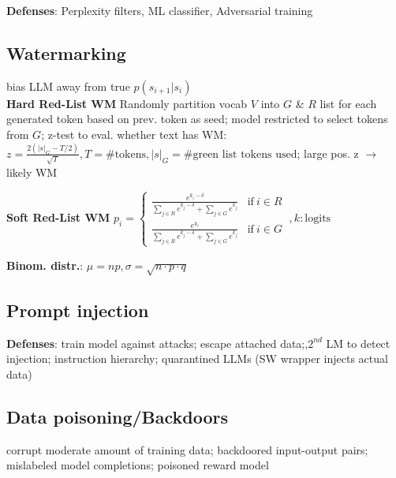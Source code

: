 \textbf{Defenses}: Perplexity filters, ML classifier, Adversarial training



\subsection{Watermarking}
bias LLM away from true $p(s_{i+1}|s_i)$\\
\textbf{Hard Red-List WM} Randomly partition vocab $V$ into $G$ \& $R$ list for each generated token based on prev. token as seed; model restricted to select tokens from $G$; z-test to eval. whether text has WM: $z=\frac{2(|s|_G-T/2)}{\sqrt{T}}, T=\text{\#tokens}, |s|_G=\text{\#green list tokens used}$; large pos. z $\to$ likely WM

\textbf{Soft Red-List WM} $p_i = \begin{cases}
    \frac{e^{k_i-\delta}}{\sum_{j\in R}e^{k_j-\delta}+\sum_{j\in G}e^{k_j}} & \text{if} \ i \in R\\
    \frac{e^{k_i}}{\sum_{j\in R}e^{k_j-\delta}+\sum_{j\in G}e^{k_j}} & \text{if} \ i \in G
\end{cases} \ , k: \text{logits}$

\textbf{Binom. distr.}: $\mu=np, \sigma=\sqrt{n\cdot p\cdot q}$

\subsection{Prompt injection}
\textbf{Defenses}: train model against attacks; escape attached data;,$2^{nd}$ LM to detect injection; instruction hierarchy; quarantined LLMs (SW wrapper injects actual data)

\subsection{Data poisoning/Backdoors}corrupt moderate amount of training data; backdoored input-output pairs; mislabeled model completions; poisoned reward model

